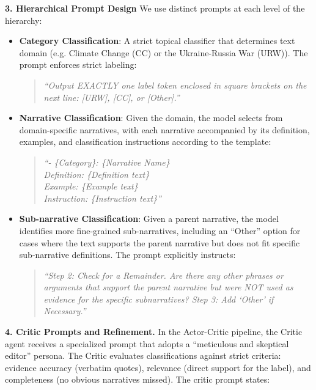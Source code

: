 \noindent\textbf{3. Hierarchical Prompt Design} 
We use distinct prompts at each level of the hierarchy:
\begin{itemize}
\item \textbf{Category Classification}: A strict topical classifier that determines text domain (e.g. Climate Change (CC) or the Ukraine-Russia War (URW)). 
The prompt enforces strict labeling: 
\begin{quote}
\small
\textit{``Output EXACTLY one label token enclosed in square brackets on the next line: [URW], [CC], or [Other].''}
\end{quote}

\item \textbf{Narrative Classification}: Given the domain, the model selects from domain-specific narratives, with each narrative accompanied by its definition, examples, and classification instructions according to the template:
\begin{quote}
\small
\textit{``- \{Category\}: \{Narrative Name\}\\
\hspace*{1em}Definition: \{Definition text\}\\
\hspace*{1em}Example: \{Example text\}\\
\hspace*{1em}Instruction: \{Instruction text\}''}
\end{quote}

\item \textbf{Sub-narrative Classification}: Given a parent narrative, the model identifies more fine-grained sub-narratives, including an ``Other'' option for cases where the text supports the parent narrative but does not fit specific sub-narrative definitions. The prompt explicitly instructs: 
\begin{quote}
\small
\textit{``Step 2: Check for a Remainder. Are there any other phrases or arguments that support the parent narrative but were NOT used as evidence for the specific subnarratives? Step 3: Add `Other' if Necessary.''}
\end{quote}
\end{itemize}

\noindent\textbf{4. Critic Prompts and Refinement.} 
In the Actor-Critic pipeline, the Critic agent receives a specialized prompt that adopts a ``meticulous and skeptical editor'' persona. The Critic evaluates classifications against strict criteria: evidence accuracy (verbatim quotes), relevance (direct support for the label), and completeness (no obvious narratives missed). The critic prompt states:

